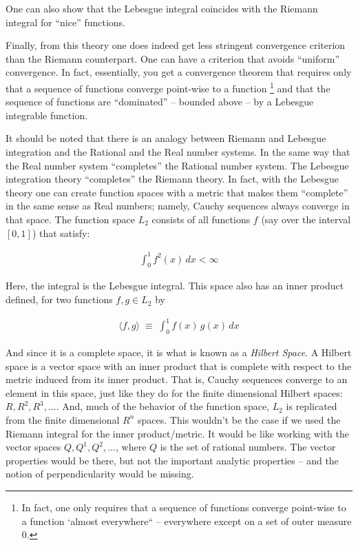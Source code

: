 \documentclass{article}
\begin{document}
One can also show that the Lebesgue integral coincides with the Riemann integral 
for ``nice'' functions.

Finally, from this theory one does indeed get less stringent convergence 
criterion than the Riemann counterpart. One can have a criterion that avoids ``uniform'' convergence.
In fact, essentially, you get a convergence theorem that requires only that a sequence
of functions converge point-wise to a function%
\footnote{In fact, one only requires that a sequence of functions converge point-wise 
to a function `almost everywhere`` -- everywhere except on a set of outer measure $0$.}
and that the sequence of functions 
are ``dominated'' -- bounded above -- by a Lebesgue integrable function.

It should be noted that there is an analogy between Riemann and Lebesgue integration 
and the Rational and the Real number systems. In the same way that the Real number 
system ``completes'' the Rational number system. The Lebesgue integration theory ``completes''
the Riemann theory. In fact, with the Lebesgue theory one can create function 
spaces with a metric that makes them ``complete'' in the same sense as Real 
numbers; namely, Cauchy sequences always converge in that space. 
The function space $L_2$ consists of
all functions $f$ (say over the interval $[0,1]$) that satisfy:

\begin{eqnarray}
\int_0^1 f^2(x) \, dx < \infty
\end{eqnarray}

Here, the integral is the Lebesgue integral. This space also has an inner 
product defined, for two functions $f, g \in L_2$ by

\begin{eqnarray}
\langle f, g \rangle \; \equiv \; \int_0^1 f(x)\, g(x)\, dx
\end{eqnarray}

And since it is a complete space, it is what is known as a {\em Hilbert Space\/}.
A Hilbert space is a vector space with an inner product that is complete with 
respect to the metric induced from its inner product. 
That is, Cauchy sequences converge to an element in this
space, just like they do for the finite dimensional Hilbert spaces: $R, R^2, R^3, \ldots$.
And, much of the behavior of the function space, $L_2$ is replicated from 
the finite dimensional $R^n$ spaces. This wouldn't be the case if we used
the Riemann integral for the inner product/metric. It would be like
working with the vector spaces $Q, Q^1, Q^2, \ldots$, where $Q$ is the set 
of rational numbers. The vector properties would be there, but not 
the important analytic properties -- and the notion of perpendicularity would
be missing.
\end{document}
